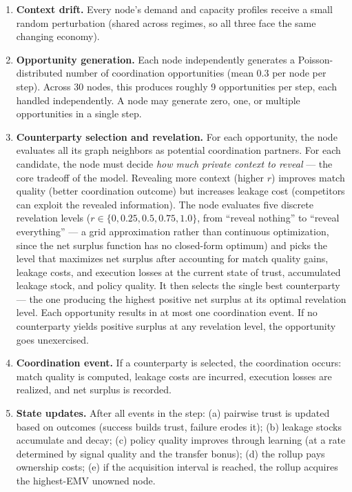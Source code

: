 \documentclass[12pt]{article}
\theoremstyle{definition}
\begin{document}
\begin{enumerate}[leftmargin=*]
\item \textbf{Context drift.} Every node's demand and capacity profiles receive a small random perturbation (shared across regimes, so all three face the same changing economy).

\item \textbf{Opportunity generation.} Each node independently generates a Poisson-distributed number of coordination opportunities (mean 0.3 per node per step). Across 30 nodes, this produces roughly 9 opportunities per step, each handled independently. A node may generate zero, one, or multiple opportunities in a single step.

\item \textbf{Counterparty selection and revelation.} For each opportunity, the node evaluates all its graph neighbors as potential coordination partners. For each candidate, the node must decide \textit{how much private context to reveal} --- the core tradeoff of the model. Revealing more context (higher $r$) improves match quality (better coordination outcome) but increases leakage cost (competitors can exploit the revealed information). The node evaluates five discrete revelation levels ($r \in \{0, 0.25, 0.5, 0.75, 1.0\}$, from ``reveal nothing'' to ``reveal everything'' --- a grid approximation rather than continuous optimization, since the net surplus function has no closed-form optimum) and picks the level that maximizes net surplus after accounting for match quality gains, leakage costs, and execution losses at the current state of trust, accumulated leakage stock, and policy quality. It then selects the single best counterparty --- the one producing the highest positive net surplus at its optimal revelation level. Each opportunity results in at most one coordination event. If no counterparty yields positive surplus at any revelation level, the opportunity goes unexercised.

\item \textbf{Coordination event.} If a counterparty is selected, the coordination occurs: match quality is computed, leakage costs are incurred, execution losses are realized, and net surplus is recorded.

\item \textbf{State updates.} After all events in the step: (a) pairwise trust is updated based on outcomes (success builds trust, failure erodes it); (b) leakage stocks accumulate and decay; (c) policy quality improves through learning (at a rate determined by signal quality and the transfer bonus); (d) the rollup pays ownership costs; (e) if the acquisition interval is reached, the rollup acquires the highest-EMV unowned node.
\end{enumerate}
\end{document}
